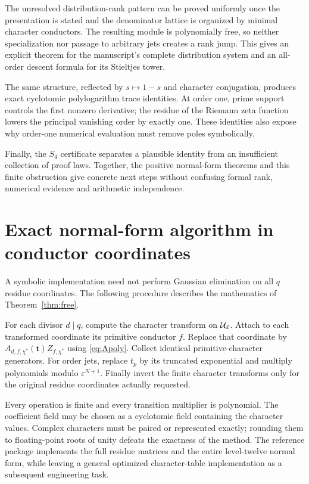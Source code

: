 \documentclass[11pt]{article}
\numberwithin{equation}{section}
\theoremstyle{definition}\newtheorem{definition}[theorem]{Definition}
\theoremstyle{remark}\newtheorem{remark}[theorem]{Remark}
\newcommand{\eps}{\varepsilon}
\newcommand{\ch}{\chi^*}
\begin{document}
The unresolved distribution-rank pattern can be proved uniformly once the
presentation is stated and the denominator lattice is organized by minimal
character conductors. The resulting module is polynomially free, so neither
specialization nor passage to arbitrary jets creates a rank jump. This gives
an explicit theorem for the manuscript's complete distribution system and
an all-order descent formula for its Stieltjes tower.

The same structure, reflected by $s\mapsto1-s$ and character conjugation,
produces exact cyclotomic polylogarithm trace identities. At order one,
prime support controls the first nonzero derivative; the residue of the
Riemann zeta function lowers the principal vanishing order by exactly one.
These identities also expose why order-one numerical evaluation must remove
poles symbolically.

Finally, the $S_4$ certificate separates a plausible identity from an
insufficient collection of proof laws. Together, the positive normal-form
theorems and this finite obstruction give concrete next steps without
confusing formal rank, numerical evidence and arithmetic independence.

\appendix
\section{Exact normal-form algorithm in conductor coordinates}

A symbolic implementation need not perform Gaussian elimination on all
$q$ residue coordinates. The following procedure describes the mathematics
of Theorem~\ref{thm:free}.

For each divisor $d\mid q$, compute the character transform on $\mathcal U_d$.
Attach to each transformed coordinate its primitive conductor $f$.
Replace that coordinate by $A_{d,f,\ch}(\mathbf t)Z_{f,\ch}$ using
\eqref{eq:Apoly}. Collect identical primitive-character generators.
For order jets, replace $t_p$ by its truncated exponential and multiply
polynomials modulo $\eps^{N+1}$. Finally invert the finite character
transforms only for the original residue coordinates actually requested.

Every operation is finite and every transition multiplier is polynomial.
The coefficient field may be chosen as a cyclotomic field containing the
character values. Complex characters must be paired or represented exactly;
rounding them to floating-point roots of unity defeats the exactness of the
method. The reference package implements the full residue matrices and the
entire level-twelve normal form, while leaving a general optimized
character-table implementation as a subsequent engineering task.
\end{document}
